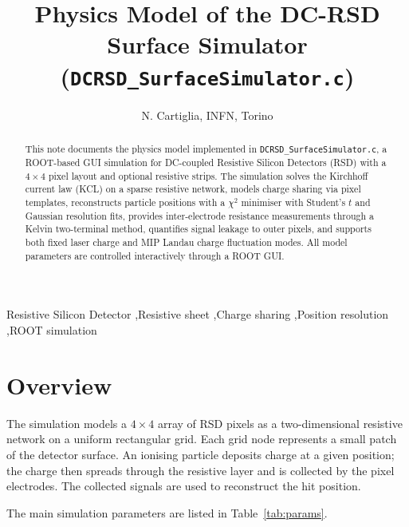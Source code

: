\documentclass[preprint,numbers,1p]{elsarticle}
\begin{document}
\begin{frontmatter}

\title{Physics Model of the DC-RSD Surface Simulator (\texttt{DCRSD\_SurfaceSimulator.c})}

\author{N. Cartiglia, INFN, Torino}

\begin{abstract}
This note documents the physics model implemented in \texttt{DCRSD\_SurfaceSimulator.c},
a ROOT-based GUI simulation for DC-coupled Resistive Silicon Detectors (RSD) with a $4\times4$ pixel
layout and optional resistive strips. The simulation solves the Kirchhoff current law (KCL)
on a sparse resistive network, models charge sharing via pixel templates, reconstructs
particle positions with a $\chi^2$ minimiser with Student's $t$ and Gaussian resolution fits,
provides inter-electrode resistance measurements through a Kelvin two-terminal method,
quantifies signal leakage to outer pixels, and supports both fixed laser charge and
MIP Landau charge fluctuation modes. All model parameters are controlled interactively
through a ROOT GUI.
\end{abstract}

\begin{keyword}
Resistive Silicon Detector \sep Resistive sheet \sep Charge sharing \sep Position resolution \sep ROOT simulation
\end{keyword}

\end{frontmatter}

\section{Overview}
\label{sec:overview}

The simulation models a $4\times4$ array of RSD pixels as a two-dimensional resistive network
on a uniform rectangular grid. Each grid node represents a small patch of the detector surface.
An ionising particle deposits charge at a given position; the charge then spreads through the
resistive layer and is collected by the pixel electrodes. The collected signals are used to
reconstruct the hit position.

The main simulation parameters are listed in Table~\ref{tab:params}.
\end{document}
